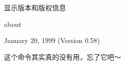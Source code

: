 \label{cmd:about}

显示版本和版权信息

\begin{SACSyntax}
about
\end{SACSyntax}

January 20, 1999 (Version 0.58)

这个命令其实真的没有用，忘了它吧～
